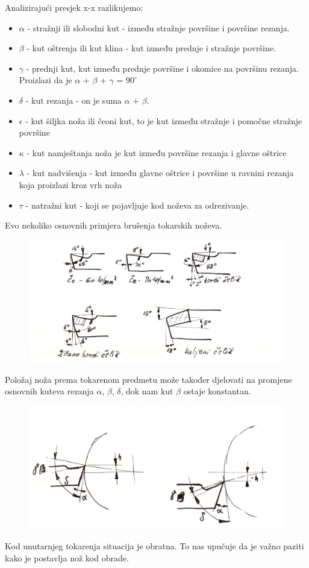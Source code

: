 \documentclass[a4paper,12pt]{article}
\numberwithin{figure}{section}
\begin{document}
\FloatBarrier
Analizirajući presjek x-x razlikujemo:
\begin{itemize}
\item $\alpha$ - stražnji ili slobodni kut - između stražnje površine i površine rezanja. 
\item $\beta$ - kut oštrenja ili kut klina - kut između prednje i stražnje površine.
\item $\gamma$ - prednji kut, kut između prednje površine i okomice na površinu rezanja. Proizlazi da je $\alpha$ + $\beta$ + $\gamma$ = $90^{\circ}$
\item $\delta$ - kut rezanja - on je suma $\alpha$ + $\beta$.
\item $\epsilon$ - kut šiljka noža ili čeoni kut, to je kut između stražnje i pomočne stražnje površine
\item $\kappa$ - kut namještanja noža je kut između površine rezanja i glavne oštrice
\item $\lambda$ - kut nadvišenja - kut između glavne oštrice i površine u ravnini rezanja koja proizlazi kroz vrh noža
\item $\tau$ - natražni kut - koji se pojavljuje kod noževa za odrezivanje.
\end{itemize}
Evo nekoliko osnovnih primjera brušenja tokarskih noževa.
\begin{figure}[!h]
\includegraphics[width=\textwidth]{image_03.png}
\end{figure}
\FloatBarrier
Položaj noža prema tokarenom predmetu može također djelovati na promjene osnovnih kuteva rezanja $\alpha$, $\beta$, $\delta$, dok nam kut $\beta$ ostaje konstantan.
\begin{figure}[!h]
\includegraphics[width=\textwidth]{image_04.png}
\end{figure}
\FloatBarrier
Kod unutarnjeg tokarenja situacija je obratna. To nas upučuje da je važno paziti kako je postavlja nož kod obrade. 
\end{document}
